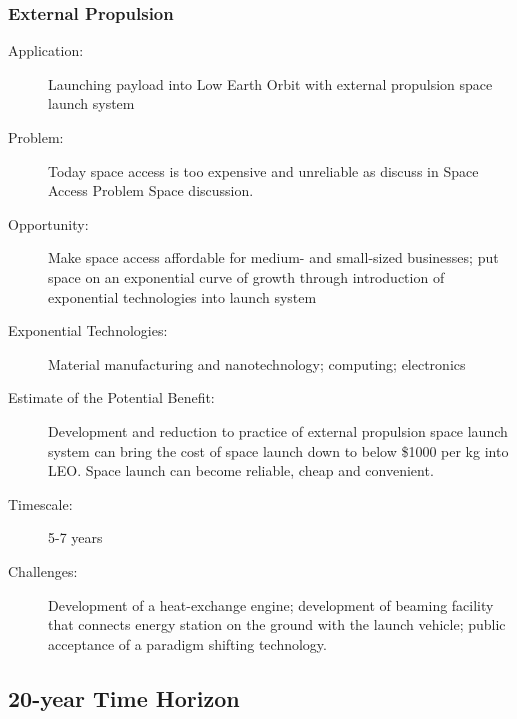  
\subsubsection{External Propulsion}
\begin{description}  \item[Application:] Launching payload into Low Earth Orbit with external propulsion space launch  system
 
\item[Problem:]  Today space access is too expensive and unreliable as discuss in Space  Access Problem Space discussion.
 
\item[Opportunity:] Make space  access affordable for medium- and small-sized businesses; put space on  an exponential curve of growth through introduction of exponential  technologies into launch system
 
\item[Exponential Technologies:]  Material manufacturing and nanotechnology; computing; electronics
 
\item[Estimate  of the Potential Benefit:] Development and reduction to practice of  external propulsion space launch system can bring the cost of space  launch down to below \$1000 per kg into LEO. Space launch can become  reliable, cheap and convenient. 
 
\item[Timescale:] 5-7 years
 
\item[Challenges:]  Development of a heat-exchange engine; development of beaming facility  that connects energy station on the ground with the launch vehicle;  public acceptance of a paradigm shifting technology.
 
\end{description}

\subsection{20-year Time Horizon}

